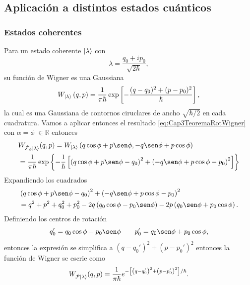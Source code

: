             \subsection{Aplicación a distintos estados cuánticos}
                
                \subsubsection{Estados coherentes}

                Para un estado coherente $\ket{\lambda}$ con
                \begin{equation*}
                    \lambda = \frac{q_0 + ip_0}{\sqrt{2\hbar}},
                \end{equation*}
                su función de Wigner es una Gaussiana \cite{glauber1963coherent,cahill1969density}
                \begin{equation}
                    W_{\ket{\lambda}}\left(q,p\right) = \frac{1}{\pi\hbar} \exp\left[- \frac{(q-q_0)^2 + (p-p_0)^2}{\hbar} \right],
                \end{equation}
                la cual es una Gaussiana de contornos ciruclares de ancho $\sqrt{\hbar/2}$ en cada cuadratura.  Vamos a aplicar entonces el resultado \ref{eq:Cap3TeoremaRotWigner} con $\alpha = \phi\;\in \mathbb{R}$ entonces
                \begin{align}
                    & W_{\hat{\mathcal{F}}_\phi \ket{\lambda}} (q,p) = W_{\ket{\lambda}}\left(q\cos\phi + p\sen\phi, -q\sen\phi + p\cos\phi \right) \nonumber \\
                    & = \frac{1}{\pi\hbar} \exp \left\{ -\frac{1}{\hbar} \left[ \left(q\cos\phi + p\sen\phi - q_0\right)^2 + \left(-q\sen\phi + p \cos\phi - p_0\right)^2 \right] \right\}
                \end{align}
                Expandiendo los cuadrados
                \begin{align*}
                    & \left(q\cos\phi + p\sen\phi - q_0\right)^2 + \left(-q\sen\phi + p\cos\phi - p_0\right)^2 \\
                    & = q^2 + p^2 + q_0^2 + p_0^2 - 2q\left( q_0\cos\phi - p_0\sen\phi \right) - 2p\left( q_0\sen\phi + p_0\cos\phi \right).
                \end{align*}
                Definiendo los centros de rotación
                \begin{equation*}
                    q_0' = q_0\cos\phi - p_0\sen\phi \qquad p_0' = q_0\sen\phi + p_0\cos\phi,
                \end{equation*}
                entonces la expresión se simplifica a $\left(q-q_0'\right)^2 + \left(p-p_0'\right)^2$ entonces la función de Wigner se escrie como
                \begin{equation}\label{eq:Cap3WignerRotFormal}
                    W_{\hat{\mathcal{F}}\ket{\lambda}} (q,p) = \frac{1}{\pi\hbar} e^{-\left[ \left(q-q_0'\right)^2 + \left(p-p_0'\right)^2\right]/\hbar}.
                \end{equation}

